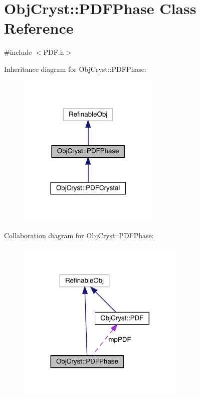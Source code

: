 \hypertarget{class_obj_cryst_1_1_p_d_f_phase}{}\section{Obj\+Cryst\+::P\+D\+F\+Phase Class Reference}
\label{class_obj_cryst_1_1_p_d_f_phase}


{\ttfamily \#include $<$P\+D\+F.\+h$>$}



Inheritance diagram for Obj\+Cryst\+::P\+D\+F\+Phase\+:
\nopagebreak
\begin{figure}[H]
\begin{center}
\leavevmode
\includegraphics[width=192pt]{class_obj_cryst_1_1_p_d_f_phase__inherit__graph}
\end{center}
\end{figure}


Collaboration diagram for Obj\+Cryst\+::P\+D\+F\+Phase\+:
\nopagebreak
\begin{figure}[H]
\begin{center}
\leavevmode
\includegraphics[width=227pt]{class_obj_cryst_1_1_p_d_f_phase__coll__graph}
\end{center}
\end{figure}
